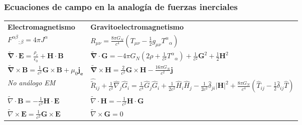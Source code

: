 \documentclass[aspectratio=169,10pt,usenames,dvipsnames,spanish]{beamer}
\newcommand{\ve}[1]{\mathbf{#1}}    %
\begin{document}
\begin{frame}
\frametitle{Ecuaciones de campo en la analogía de fuerzas inerciales}
\begin{center}
\renewcommand{\arraystretch}{1.0} %
\setlength{\tabcolsep}{1pt} %

\begin{tabular}{p{} p{}}
\textbf{Electromagnetismo} 
& 
\textbf{Gravitoelectromagnetismo} \\[0.4cm]

$F^{\alpha\beta}{}_{;\beta} = 4\pi J^{\alpha}$ 
& $R_{\mu\nu} = \frac{8\pi G_N}{c^4}\left(T_{\mu\nu} - \tfrac{1}{2}g_{\mu\nu}T^{\alpha}{}_{\alpha}\right)$ \\[0.4cm]

$\tilde{\ve{\nabla}}\cdot\ve{E} =\frac{\rho_c}{\epsilon_0} + \ve{H}\cdot\ve{B}$
& 
$\tilde{\ve{\nabla}}\cdot\ve{G} = -4\pi G_N(2\rho + \frac{1}{c^2}T^{\alpha}{}_{\alpha}) + \frac{1}{c^2}\ve{G}^2 + \frac{1}{2}\ve{H}^2$ \\[0.4cm]
$\tilde{\ve{\nabla}}\times\ve{B} = \frac{1}{c^2}\ve{G}\times\ve{B} + \mu_0\ve{j_e}$
&
$\tilde{\ve{\nabla}}\times\ve{H} = \frac{2}{c^2}\ve{G}\times\ve{H} - \frac{16\pi G_N}{c^2}\ve{j}$ \\[0.4cm]

\textit{No análogo EM}
&
$\hat{\tilde{R}}_{ij}+\frac{1}{c^2}\hat{\nabla}_j\hat{G}_i=\frac{1}{c^4}\hat{G}_j\hat{G}_i+\frac{1}{2c^2}\hat{H}_i\hat{H}_j-\frac{1}{2c^2}\hat{\delta}_{ji}|\ve{H}|^2+\frac{8\pi G_N}{c^4}(\hat{T}_{ij}-\frac{1}{2}\hat{\delta}_{ij}\hat{T})$\\[0.4cm]
$\tilde{\nabla}\cdot\ve{B}=-\frac{1}{c^2}\ve{H}\cdot\ve{E}$ & $\tilde{\nabla}\cdot\ve{H}=-\frac{1}{c^2}\ve{H}\cdot\ve{G}$\\[0.4cm]
$\tilde{\nabla}\times\ve{E}=\frac{1}{c^2}\ve{G}\times\ve{E}$ & $\tilde{\nabla}\times\ve{G}=0$
\end{tabular}
\end{center}
\end{frame}


\end{document}

